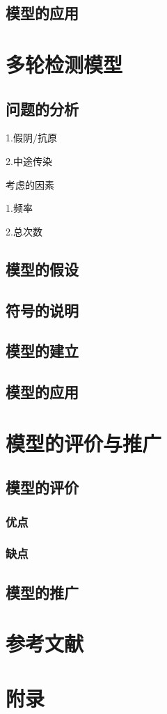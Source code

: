 \documentclass[12pt]{article}
\begin{document}
\subsection{模型的应用}

{\centering\section{多轮检测模型}}

\subsection{问题的分析}

1.假阴/抗原

2.中途传染

考虑的因素

1.频率

2.总次数

\subsection{模型的假设}

\subsection{符号的说明}

\subsection{模型的建立}

\subsection{模型的应用}

{\centering\section{模型的评价与推广}}

\subsection{模型的评价}

\subsubsection{优点}

\subsubsection{缺点}

\subsection{模型的推广}

\newpage
\appendix
{\centering\section*{参考文献}}
{\centering\section*{附录}}
\end{document}
